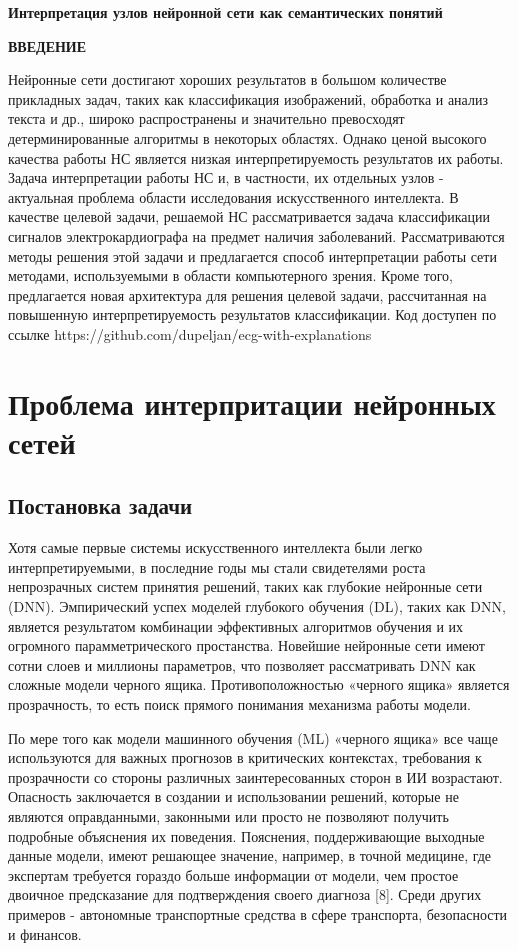 \documentclass[oneside,final,14pt]{extreport}
\begin{document}
\tableofcontents
\newpage
\begin{center}
\bfseries Интерпретация узлов нейронной сети как семантических понятий
\end{center}
\newpage
\begin{center}
\bfseries ВВЕДЕНИЕ
\end{center}
Нейронные сети достигают хороших результатов в большом количестве прикладных задач, таких как классификация изображений, обработка и анализ текста и др., широко распространены и значительно превосходят детерминированные алгоритмы в некоторых областях. Однако ценой высокого качества работы НС является низкая интерпретируемость результатов их работы. Задача интерпретации работы НС и, в частности, их отдельных узлов - актуальная проблема области исследования искусственного интеллекта. В качестве целевой задачи, решаемой НС рассматривается задача классификации сигналов электрокардиографа на предмет наличия заболеваний. Рассматриваются методы решения этой задачи и предлагается способ интерпретации работы сети методами, используемыми в области компьютерного зрения. Кроме того, предлагается новая архитектура для решения целевой задачи, рассчитанная на повышенную интерпретируемость результатов классификации. Код доступен по ссылке https://github.com/dupeljan/ecg-with-explanations

\chapter{Проблема интерпритации нейронных сетей}
\section{Постановка задачи}
Хотя самые первые системы искусственного интеллекта были легко интерпретируемыми, в последние годы мы стали свидетелями роста непрозрачных систем принятия решений, таких как глубокие нейронные сети (DNN). Эмпирический успех моделей глубокого обучения (DL), таких как DNN, является результатом комбинации эффективных алгоритмов обучения и их огромного парамметрического простанства. Новейшие нейронные сети имеют сотни слоев и миллионы параметров, что позволяет рассматривать DNN как сложные модели черного ящика. Противоположностью «черного ящика» является прозрачность, то есть поиск прямого понимания механизма работы модели.

По мере того как модели машинного обучения (ML) «черного ящика» все чаще используются для важных прогнозов в критических контекстах, требования к прозрачности со стороны различных заинтересованных сторон в ИИ возрастают. Опасность заключается в создании и использовании решений, которые не являются оправданными, законными или просто не позволяют получить подробные объяснения их поведения. Пояснения, поддерживающие выходные данные модели, имеют решающее значение, например, в точной медицине, где экспертам требуется гораздо больше информации от модели, чем простое двоичное предсказание для подтверждения своего диагноза [8]. Среди других примеров - автономные транспортные средства в сфере транспорта, безопасности и финансов.
\end{document}
